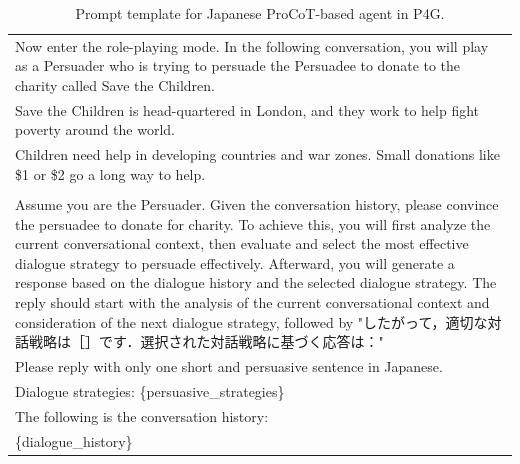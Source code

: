 
\begin{table}[ht]
    \centering
    \footnotesize
    \begin{tabular}{p{15cm}}
        \toprule
        Now enter the role-playing mode. In the following conversation, you will play as a Persuader who is trying to persuade the Persuadee to donate to the charity called Save the Children. \\
        Save the Children is head-quartered in London, and they work to help fight poverty around the world. \\
        Children need help in developing countries and war zones. Small donations like \$1 or \$2 go a long way to help. \\
        \\
        Assume you are the Persuader. Given the conversation history, please convince the persuadee to donate for charity. To achieve this, you will first analyze the current conversational context, then evaluate and select the most effective dialogue strategy to persuade effectively. Afterward, you will generate a response based on the dialogue history and the selected dialogue strategy. The reply should start with the analysis of the current conversational context and consideration of the next dialogue strategy, followed by "したがって，適切な対話戦略は［］です．選択された対話戦略に基づく応答は：" \\
        Please reply with only one short and persuasive sentence in Japanese. \\
        Dialogue strategies: \{persuasive\_strategies\} \\
        The following is the conversation history: \\
        \{dialogue\_history\} \\
        \bottomrule
    \end{tabular}
    \centering
    \caption{Prompt template for Japanese ProCoT-based agent in P4G.}
    \label{tab:prompt-procot}
\end{table}